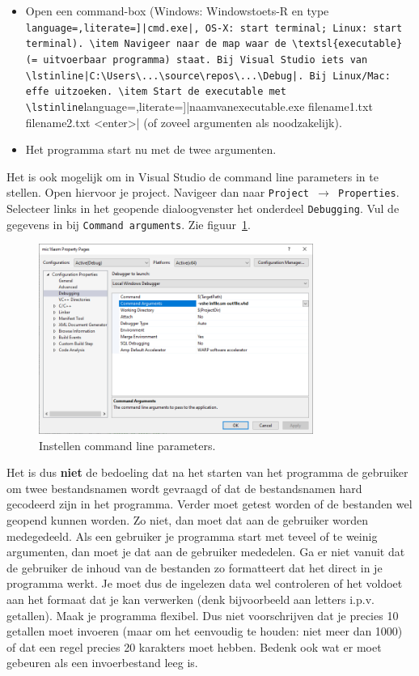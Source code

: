 \documentclass[a4paper,10pt,fleqn,twoside]{article}
\begin{document}
\begin{itemize}
\item Open een command-box (Windows: Windowstoets-R en type \lstinline[language=,literate=]|cmd.exe|, OS-X: start terminal; Linux: start terminal).
\item Navigeer naar de map waar de \textsl{executable} (= uitvoerbaar programma) staat. Bij Visual Studio iets van \lstinline|C:\Users\...\source\repos\...\Debug|. Bij Linux/Mac: effe uitzoeken.
\item Start de executable met \lstinline[language=,literate=]|naamvanexecutable.exe filename1.txt filename2.txt <enter>| (of zoveel argumenten als noodzakelijk).
\item Het programma start nu met de twee argumenten.
\end{itemize}

Het is ook mogelijk om in Visual Studio de command line parameters in te stellen. Open hiervoor je project. Navigeer dan naar \texttt{Project $\rightarrow$ Properties}. Selecteer links in het geopende dialoogvenster het onderdeel \texttt{Debugging}. Vul de gegevens in bij \texttt{Command arguments}. Zie figuur~\ref{fig:comdlineparams}.


\begin{figure}[H]
\centering
\includegraphics[width=0.8\textwidth]{cmdlineparams}
\caption{Instellen command line parameters.}
\label{fig:comdlineparams}
\end{figure}

Het is dus \textbf{niet} de bedoeling dat na het starten van het programma de gebruiker om twee bestandsnamen wordt gevraagd of dat de bestandsnamen hard gecodeerd zijn in het programma. Verder moet getest worden of de bestanden wel geopend kunnen worden. Zo niet, dan moet dat aan de gebruiker worden medegedeeld. Als een gebruiker je programma start met teveel of te weinig argumenten, dan moet je dat aan de gebruiker mededelen. Ga er niet vanuit dat de gebruiker de inhoud van de bestanden zo formatteert dat het direct in je programma werkt. Je moet dus de ingelezen data wel controleren of het voldoet aan het formaat dat je kan verwerken (denk bijvoorbeeld aan letters i.p.v. getallen). Maak je programma flexibel. Dus niet voorschrijven dat je precies 10 getallen moet invoeren (maar om het eenvoudig te houden: niet meer dan 1000) of dat een regel precies 20 karakters moet hebben. Bedenk ook wat er moet gebeuren als een invoerbestand leeg is.
\end{document}

